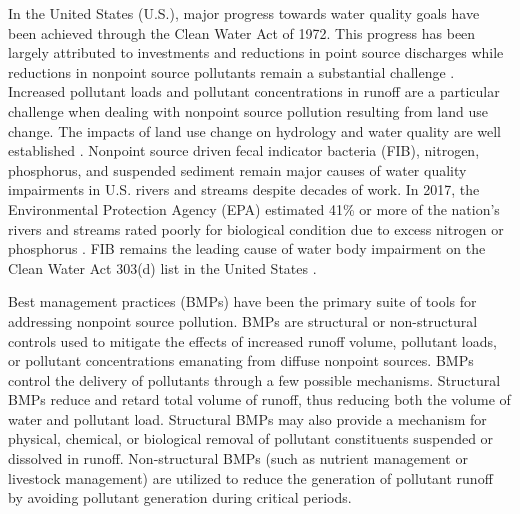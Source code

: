 \documentclass[utf8]{FrontiersinHarvard}
\begin{document}
In the United States (U.S.), major progress towards water quality goals have been achieved through the Clean Water Act of 1972.
This progress has been largely attributed to investments and reductions in point source discharges while reductions in nonpoint source pollutants remain a substantial challenge \citep{benhamLessonsLearnedTMDL2008, nationalresearchcouncilAssessingTMDLApproach2001, schrammTotalMaximumDaily2022}.
Increased pollutant loads and pollutant concentrations in runoff are a particular challenge when dealing with nonpoint source pollution resulting from land use change.
The impacts of land use change on hydrology and water quality are well established \citep{allanLandscapesRiverscapesInfluence2004, carpenterNonpointPollutionSurface1998, bernhardtUnderstandingManagingMinimizing2008, careyEvaluatingNutrientImpacts2013, freemanImpactsUrbanizationDevelopment2019}.
Nonpoint source driven fecal indicator bacteria (FIB), nitrogen, phosphorus, and suspended sediment remain major causes of water quality impairments in U.S. rivers and streams despite decades of work.
In 2017, the Environmental Protection Agency (EPA) estimated 41\% or more of the nation's rivers and streams rated poorly for biological condition due to excess nitrogen or phosphorus \citep{epaNationalWaterQuality2017}.
FIB remains the leading cause of water body impairment on the Clean Water Act 303(d) list in the United States \citep{epaNationalWaterQuality2017}.

Best management practices (BMPs) have been the primary suite of tools for addressing nonpoint source pollution.
BMPs are structural or non-structural controls used to mitigate the effects of increased runoff volume, pollutant loads, or pollutant concentrations emanating from diffuse nonpoint sources.
BMPs control the delivery of pollutants through a few possible mechanisms.
Structural BMPs reduce and retard total volume of runoff, thus reducing both the volume of water and pollutant load.
Structural BMPs may also provide a mechanism for physical, chemical, or biological removal of pollutant constituents suspended or dissolved in runoff.
Non-structural BMPs (such as nutrient management or livestock management) are utilized to reduce the generation of pollutant runoff by avoiding pollutant generation during critical periods.
\end{document}
